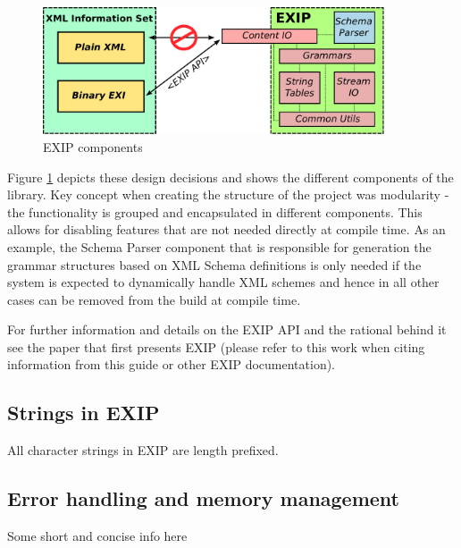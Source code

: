 \begin{figure}[h!]
 \begin{center}
 \includegraphics[width=0.90\textwidth, keepaspectratio=true]{images/EXIP-overview.pdf}
\end{center}
\caption{EXIP components}
\label{fig:EXIP-components} 
\end{figure} 

Figure \ref{fig:EXIP-components} depicts these design decisions and shows the different components of
the library. Key concept when creating the structure of the project was modularity - the functionality
is grouped and encapsulated in different components. This allows for disabling features that are not
needed directly at compile time. As an example, the Schema Parser component that is responsible for
generation the grammar structures based on XML Schema definitions is only needed if the system is
expected to dynamically handle XML schemes and hence in all other cases can be removed from the build at compile time. 

For further information and details on the EXIP API and the rational
behind it see the paper that first presents EXIP \cite{RumenKyusakov2011} (please refer to this work when 
citing information from this guide or other EXIP documentation).

\subsection{Strings in EXIP}
\label{sec:strings}

All character strings in EXIP are length prefixed. 

\subsection{Error handling and memory management}
\label{sec:errors-memory}

Some short and concise info here